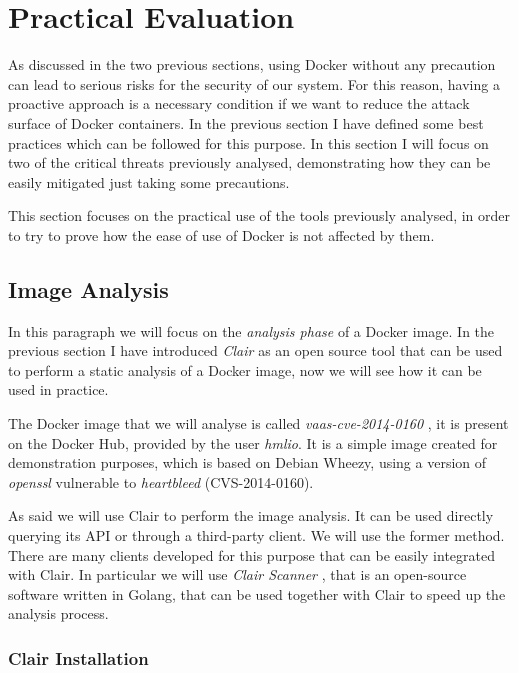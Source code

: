 \documentclass[a4paper,12pt]{article}
\begin{document}
\newpage

\section{Practical Evaluation}
\label{sec:practical_evaluation}

As discussed in the two previous sections, using Docker without any precaution
can lead to serious risks for the security of our system. For this reason,
having a proactive approach is a necessary condition if we want to reduce the
attack surface of Docker containers. In the previous section I have defined some
best practices which can be followed for this purpose. In this section I will
focus on two of the critical threats previously analysed, demonstrating how they
can be easily mitigated just taking some precautions. \par This section focuses
on the practical use of the tools previously analysed, in order to try to prove
how the ease of use of Docker is not affected by them. 

\subsection{Image Analysis}

In this paragraph we will focus on the \textit{analysis phase} of a Docker
image. In the previous section I have introduced \textit{Clair} as an open
source tool that can be used to perform a static analysis of a Docker image, now
we will see how it can be used in practice. \par The Docker image that we will
analyse is called \textit{vaas-cve-2014-0160} \cite{hmlio}, it is present on the
Docker Hub, provided by the user \textit{hmlio}. It is a simple image created
for demonstration purposes, which is based on Debian Wheezy, using a version of
\textit{openssl} vulnerable to \textit{heartbleed} (CVS-2014-0160). \par As said
we will use Clair to perform the image analysis. It can be used directly
querying its API or through a third-party client. We will use the former method.
There are many clients developed for this purpose that can be easily integrated
with Clair. In particular we will use \textit{Clair Scanner}
\cite{clair-scanner}, that is an open-source software written in Golang, that can be
used together with Clair to speed up the analysis process.

\subsubsection{Clair Installation}
\end{document}
